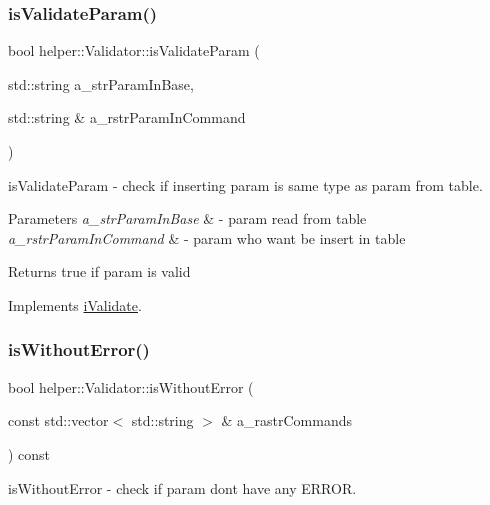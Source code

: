 \subsubsection{\texorpdfstring{isValidateParam()}{isValidateParam()}}
{\footnotesize\ttfamily bool helper\+::\+Validator\+::is\+Validate\+Param (\begin{DoxyParamCaption}\item[{std\+::string}]{a\+\_\+str\+Param\+In\+Base,  }\item[{std\+::string \&}]{a\+\_\+rstr\+Param\+In\+Command }\end{DoxyParamCaption})\hspace{0.3cm}{\ttfamily [virtual]}}



is\+Validate\+Param -\/ check if inserting param is same type as param from table. 


\begin{DoxyParams}{Parameters}
{\em a\+\_\+str\+Param\+In\+Base} & -\/ param read from table \\
\hline
{\em a\+\_\+rstr\+Param\+In\+Command} & -\/ param who want be insert in table \\
\hline
\end{DoxyParams}
\begin{DoxyReturn}{Returns}
true if param is valid 
\end{DoxyReturn}


Implements \mbox{\hyperlink{classi_validate}{i\+Validate}}.

\mbox{\label{classhelper_1_1_validator_a0d353649adaa559a8de7ad3f9ad56881}} 
\subsubsection{\texorpdfstring{isWithoutError()}{isWithoutError()}}
{\footnotesize\ttfamily bool helper\+::\+Validator\+::is\+Without\+Error (\begin{DoxyParamCaption}\item[{const std\+::vector$<$ std\+::string $>$ \&}]{a\+\_\+rastr\+Commands }\end{DoxyParamCaption}) const\hspace{0.3cm}{\ttfamily [virtual]}}



is\+Without\+Error -\/ check if param dont have any E\+R\+R\+OR. 


